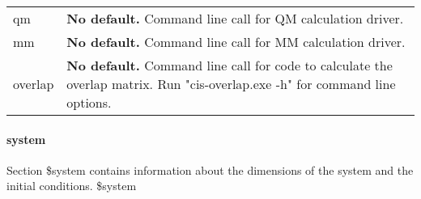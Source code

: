 \documentclass{report}
\begin{document}
\begin{tabularx}{\textwidth}{ m{2.5cm} X }
qm				&
	\textbf{No default.} \newline
	Command line call for QM calculation driver.  \\

mm				&
	\textbf{No default.} \newline
	Command line call for MM calculation driver.  \\

overlap				&
    	\textbf{No default.} \newline
	Command line call for code to calculate the overlap matrix. Run "cis-overlap.exe -h" for command line options.
\end{tabularx}

\paragraph{system}
Section \$system contains information about the dimensions of the system and the initial conditions. \newline
\$system
\end{document}

